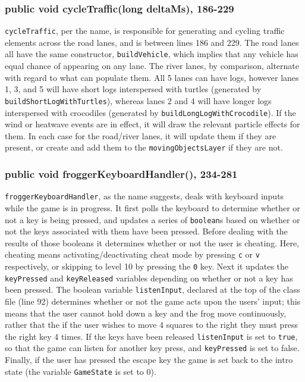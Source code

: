 \documentclass[12pt]{article}
\begin{document}
\subsubsection{public void cycleTraffic(long deltaMs), 186-229}
\verb|cycleTraffic|, per the name, is responsible for generating and cycling traffic elements across the road lanes, and is between lines 186 and 229.
The road lanes all have the same constructor, \verb|buildVehicle|, which implies that any vehicle has equal chance of appearing on any lane.
The river lanes, by comparison, alternate with regard to what can populate them.
All 5 lanes can have logs, however lanes 1, 3, and 5 will have short logs interspersed with turtles (generated by \verb|buildShortLogWithTurtles|), whereas lanes 2 and 4 will have longer logs interspersed with crocodiles (generated by \verb|buildLongLogWithCrocodile|).
If the wind or heatwave events are in effect, it will draw the relevant particle effects for them.
In each case for the road/river lanes, it will update them if they are present, or create and add them to the \verb|movingObjectsLayer| if they are not.

\subsubsection{public void froggerKeyboardHandler(), 234-281}
\verb|froggerKeyboardHandler|, as the name suggests, deals with keyboard inputs while the game is in progress.
It first polls the keyboard to determine whether or not a key is being pressed, and updates a series of \verb|boolean|s based on whether or not the keys associated with them have been pressed.
Before dealing with the results of those booleans it determines whether or not the user is cheating.
Here, cheating means activating/deactivating cheat mode by pressing \verb|c| or \verb|v| respectively, or skipping to level 10 by pressing the \verb|0| key.
Next it updates the \verb|keyPressed| and \verb|keyReleased| variables depending on whether or not a key has been pressed.
The boolean variable \verb|listenInput|, declared at the top of the class file (line 92) determines whether or not the game acts upon the users' input; this means that the user cannot hold down a key and the frog move continuously, rather that the if the user wishes to move 4 squares to the right they must press the right key 4 times.
If the keys have been released \verb|listenInput| is set to \verb|true|, so that the game can listen for another key press, and \verb|keyPressed| is set to false.
Finally, if the user has pressed the escape key the game is set back to the intro state (the variable \verb|GameState| is set to 0).
\end{document}
